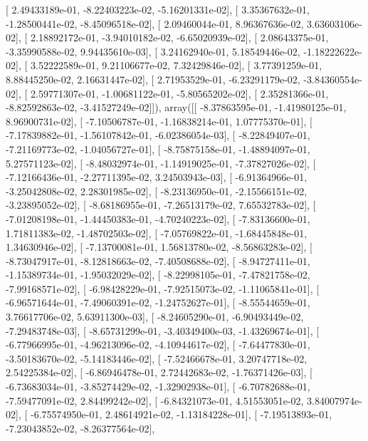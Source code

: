 \documentclass{article}
\begin{document}
       [  2.49433189e-01,  -8.22403223e-02,  -5.16201331e-02],
       [  3.35367632e-01,  -1.28500441e-02,  -8.45096518e-02],
       [  2.09460044e-01,   8.96367636e-02,   3.63603106e-02],
       [  2.18892172e-01,  -3.94010182e-02,  -6.65020939e-02],
       [  2.08643375e-01,  -3.35990588e-02,   9.94435610e-03],
       [  3.24162940e-01,   5.18549446e-02,  -1.18222622e-02],
       [  3.52222589e-01,   9.21106677e-02,   7.32429846e-02],
       [  3.77391259e-01,   8.88445250e-02,   2.16631447e-02],
       [  2.71953529e-01,  -6.23291179e-02,  -3.84360554e-02],
       [  2.59771307e-01,  -1.00681122e-01,  -5.80565202e-02],
       [  2.35281366e-01,  -8.82592863e-02,  -3.41527249e-02]]), array([[ -8.37863595e-01,  -1.41980125e-01,   8.96900731e-02],
       [ -7.10506787e-01,  -1.16838214e-01,   1.07775370e-01],
       [ -7.17839882e-01,  -1.56107842e-01,  -6.02386054e-03],
       [ -8.22849407e-01,  -7.21169773e-02,  -1.04056727e-01],
       [ -8.75875158e-01,  -1.48894097e-01,   5.27571123e-02],
       [ -8.48032974e-01,  -1.14919025e-01,  -7.37827026e-02],
       [ -7.12166436e-01,  -2.27711395e-02,   3.24503943e-03],
       [ -6.91364966e-01,  -3.25042808e-02,   2.28301985e-02],
       [ -8.23136950e-01,  -2.15566151e-02,  -3.23895052e-02],
       [ -8.68186955e-01,  -7.26513179e-02,   7.65532783e-02],
       [ -7.01208198e-01,  -1.44450383e-01,  -4.70240223e-02],
       [ -7.83136600e-01,   1.71811383e-02,  -1.48702503e-02],
       [ -7.05769822e-01,  -1.68445848e-01,   1.34630946e-02],
       [ -7.13700081e-01,   1.56813780e-02,  -8.56863283e-02],
       [ -8.73047917e-01,  -8.12818663e-02,  -7.40508688e-02],
       [ -8.94727411e-01,  -1.15389734e-01,  -1.95032029e-02],
       [ -8.22998105e-01,  -7.47821758e-02,  -7.99168571e-02],
       [ -6.98428229e-01,  -7.92515073e-02,  -1.11065841e-01],
       [ -6.96571644e-01,  -7.49060391e-02,  -1.24752627e-01],
       [ -8.55544659e-01,   3.76617706e-02,   5.63911300e-03],
       [ -8.24605290e-01,  -6.90493449e-02,  -7.29483748e-03],
       [ -8.65731299e-01,  -3.40349400e-03,  -1.43269674e-01],
       [ -6.77966995e-01,  -4.96213096e-02,  -4.10944617e-02],
       [ -7.64477830e-01,  -3.50183670e-02,  -5.14183446e-02],
       [ -7.52466678e-01,   3.20747718e-02,   2.54225384e-02],
       [ -6.86946478e-01,   2.72442683e-02,  -1.76371426e-03],
       [ -6.73683034e-01,  -3.85274429e-02,  -1.32902938e-01],
       [ -6.70782688e-01,  -7.59477091e-02,   2.84499242e-02],
       [ -6.84321073e-01,   4.51553051e-02,   3.84007974e-02],
       [ -6.75574950e-01,   2.48614921e-02,  -1.13184228e-01],
       [ -7.19513893e-01,  -7.23043852e-02,  -8.26377564e-02],
\end{document}
